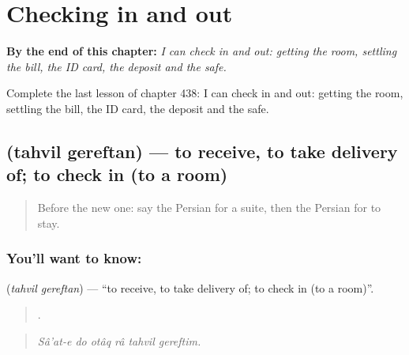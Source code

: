 
\chapter{Checking in and out}
\label{ch:fa-checking-in-and-out}

\begin{chapteropening}
\textbf{By the end of this chapter:} \emph{I can check in and out: getting the room, settling the bill, the ID card, the deposit and the safe.}

Complete the last lesson of chapter 438: I can check in and out: getting the room, settling the bill, the ID card, the deposit and the safe.
\end{chapteropening}

\section[\texorpdfstring{\fa{تحویل} \fa{گرفتن} (tahvil gereftan)}{تحویل گرفتن (tahvil gereftan)}]{  (tahvil gereftan) — to receive, to take delivery of; to check in (to a room)}

\label{lesson:FA-C438-tahvil-gereftan}



\begin{quote}
Before the new one: say the Persian for a suite, then the Persian for to stay.
\end{quote}

\subsection*{You'll want to know:  }
\textbf{ } (\emph{tahvil gereftan}) — \textquotedblleft{}to receive, to take delivery of; to check in (to a room)\textquotedblright{}.

\begin{quote}
     .
\end{quote}

\begin{quote}
\emph{Sâ'at-e do otâq râ tahvil gereftim.}
\end{quote}


